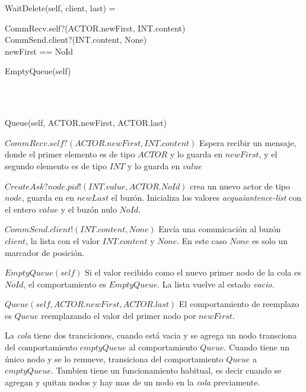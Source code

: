 \begin{process}

WaitDelete(self, client, last) = \\ \quad
  \begin{block}
  CommRecv.self?(ACTOR.newFirst, INT.content) \then \\ 
  CommSend.client?(INT.content, None) \then \\ \quad 
  \If newFirst == NoId \Then \\ \quad
    \begin{block}
      EmptyQueue(self)
    \end{block} \\ 
  \Then \\ \quad
    \begin{block}
    Queue(self, ACTOR.newFirst, ACTOR.last)
    \end{block}
  \end{block} 
\end{process}

\begin{description}
 \item $CommRecv.self?(ACTOR.newFirst, INT.content)$ Espera recibir un mensaje, donde el primer elemento es de tipo $ACTOR$ y lo guarda en $newFirst$, y el segundo elemento es de tipo $INT$ y lo guarda en $value$
 \item $CreateAsk?node.pid!(INT.value, ACTOR.NoId)$ crea un nuevo actor de tipo $node$, guarda en en $newLast$ el buzón. Inicializa los valores \textit{acquaiantence-list} con el entero $value$ y el buzón nulo $NoId$.
 \item $CommSend.client!(INT.content, None)$ Envía una comunicación al buzón $client$, la lista con el valor $INT.content$ y $None$. En este caso $None$ es solo un marcador de posición. 
 \item $EmptyQueue(self)$ Si el valor recibido como el nuevo primer nodo de la cola es $NoId$, el comportamiento es $EmptyQueue$. La lista vuelve al estado \textit{vacio}.
 \item $Queue(self, ACTOR.newFirst, ACTOR.last)$ El comportamiento de reemplazo es $Queue$ reemplazando el valor del primer nodo por $newFirst$.
 \end{description}
 
La \textit{cola} tiene dos tranciciones, cuando está vacia y se agrega un nodo transciona del comportamiento $emptyQueue$ al comportamiento $Queue$. Cuando tiene un único nodo y se lo remueve, transiciona del comportamiento $Queue$ a $emptyQueue$. Tambien tiene un funcionamiento habitual, es decir cuando se agregan y quitan nodos y hay mas de un nodo en la \textit{cola} previamente.


